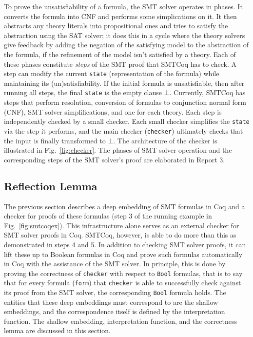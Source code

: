 \documentclass{article}
\begin{document}
	To prove the unsatisfiability of a 
	formula, the SMT solver operates in 
	phases. It converts the formula into
	CNF and performs some simplications
	on it. It then abstracts any theory
	literals into propositional ones 
	and tries to satisfy the abstraction 
	using the SAT solver; it does this
	in a cycle where the theory
	solvers give feedback
	by adding the negation of the 
	satisfying model to the 
	abstraction of the formula, if the 
	refinement of the model isn't 
	satisfied by a theory. 
	Each of these phases constitute
	\textit{steps} of the SMT proof
	that SMTCoq has to check. A step
	can modify the current 
	\texttt{state} (representation of 
	the formula) while maintaining 
	its (un)satisfiability. If the 
	initial formula is unsatisfiable, 
	then after running all steps,
	the final \texttt{state} is the 
	empty clause $\bot$. Currently, 
	SMTCoq has steps that perform 
	resolution, conversion of formulas 
	to conjunction normal form (CNF), SMT 
	solver simplifications, and one for 
	each theory. Each step is 
	independently checked by a small 
	checker. Each small
	checker simplifies the  
	\texttt{state} via the step it 
	performs, and the main checker 
	(\texttt{checker}) ultimately checks 
	that the input is 
	finally transformed to $\bot$. The 
	architecture of the checker is 
	illustrated in
	Fig.~\ref{fig:checker}. The phases 
	of SMT solver operation and the 
	corresponding steps of the
	SMT solver's proof are elaborated
	in Report 3.
	
	\subsection{Reflection Lemma}
	\label{sec:refl}
	The previous section describes a 
	deep embedding of SMT formulas 
	in Coq and a checker for 
	proofs of these formulas (step 3 of 
	the running example in 
	Fig.~\ref{fig:smtcoqex}). 
	This infrastructure alone serves 
	as an external checker for 
	SMT solver proofs in Coq.
	SMTCoq, however, is able to 
	do more than this as demonstrated
	in steps 4 and 5. In addition 
	to checking SMT solver proofs, 
	it can lift these up to 
	Boolean formulas in Coq and
	prove such formulas automatically
	in Coq with the assistance of 
	the SMT solver. In principle,
	this is done by proving the
	correctness of \texttt{checker}
	with respect to \texttt{Bool}
	formulas, that is to say that 
	for every formula (\texttt{form})
	that \texttt{checker} is able to 
	successfully check against its
	proof from the SMT solver, the 
	corresponding \texttt{Bool}
	formula holds. The entities
	that these deep embeddings 
	must correspond to are the shallow
	embeddings, and the correspondence 
	itself is defined by the 
	interpretation function. The 
	shallow embedding, interpretation
	function, and the correctness 
	lemma are discussed in this 
	section.
	
\end{document}
